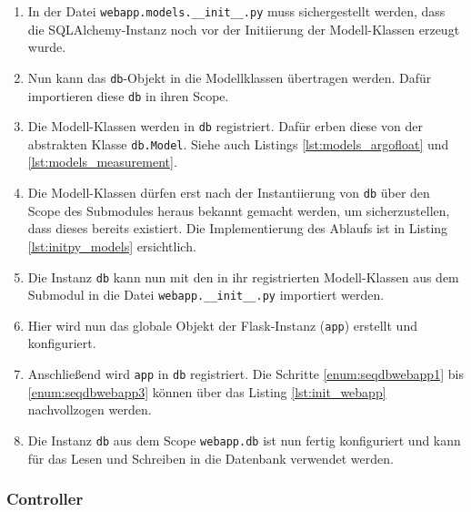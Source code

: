 \begin{enumerate}
 \item
        In der Datei \texttt{webapp.models.\_\_init\_\_.py} muss sichergestellt werden, dass die SQLAlchemy-Instanz noch vor der Initiierung der Modell-Klassen erzeugt wurde.
 \item
        Nun kann das \texttt{db}-Objekt in die Modellklassen übertragen werden. Dafür importieren diese \texttt{db} in ihren Scope.
 \item
        Die Modell-Klassen werden in \texttt{db} registriert. Dafür erben diese von der abstrakten Klasse \texttt{db.Model}. Siehe auch Listings \ref{lst:models_argofloat} und \ref{lst:models_measurement}.



 \item
        Die Modell-Klassen dürfen erst nach der Instantiierung von \texttt{db} über den Scope des Submodules heraus bekannt gemacht werden, um sicherzustellen, dass dieses bereits existiert. Die Implementierung des Ablaufs ist in Listing \ref{lst:initpy_models} ersichtlich.

 \item  \label{enum:seqdbwebapp1}
        Die Instanz \texttt{db} kann nun mit den in ihr registrierten Modell-Klassen  aus dem Submodul in die Datei \texttt{webapp.\_\_init\_\_.py} importiert werden.

\item
        Hier wird nun das globale Objekt der Flask-Instanz (\texttt{app}) erstellt und konfiguriert.

\item   \label {enum:seqdbwebapp3}
        Anschließend wird \texttt{app} in \texttt{db} registriert. Die Schritte \ref{enum:seqdbwebapp1} bis \ref{enum:seqdbwebapp3} können über das Listing \ref{lst:init_webapp} nachvollzogen werden.

\item   Die Instanz \texttt{db} aus dem Scope
        \texttt{webapp.db} ist nun fertig konfiguriert und kann für das Lesen und Schreiben in die Datenbank verwendet werden.
\end{enumerate}


\pagebreak
\subsubsection{Controller}


